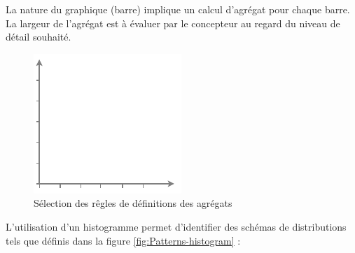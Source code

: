 \documentclass[a4paper,12pt]{article}
\begin{document}
\begin{multicols}{2}
La nature du graphique (barre) implique un calcul d'agrégat pour chaque barre. \autocite{wilkeVisualizingDistributionsHistograms2019} La largeur de l'agrégat est à évaluer par le concepteur au regard du niveau de détail souhaité.\autocite{wilkeVisualizingDistributionsHistograms2019}

\begin{figure}[H]
\centering
\includegraphics[width=.9\linewidth]{./img/histogram-agregats.pdf}
\caption{\label{fig:histo-agregats}Sélection des rêgles de définitions des agrégats}
\end{figure}


L'utilisation d'un histogramme permet d'identifier des schémas de distributions tels que définis dans la figure \ref{fig:Patterns-histogram} : \autocite{jonathanschwabishDistribution2021}


\end{multicols}
\end{document}
